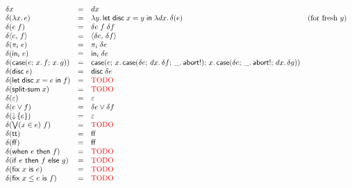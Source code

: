 \documentclass{article}
\begin{document}
\[
\begin{array}{lcll}
  \delta x &=& dx\\
  \delta(\fn\bind{x} e) &=& \fn\bind{y} \letdisc{x}{y} {\fn\bind{dx} \delta(e)}
  & \text{(for fresh $y$)}\\
  \delta(e\;f) &=& \delta e \; f \; \delta f\\
  \delta \pair{e}{f} &=& \pair{\delta{e}}{\delta{f}}\\
  \delta(\pi_i\; e) &=& \pi_i\; \delta{e}\\
  \delta(\inj{i}{e}) &=& \inj{i}{\delta{e}}\\
  \delta(\case{e}{x}{f}{x}{g})
  &=& \case{e}
        {x}{\case{\delta e}{dx}{\delta f}{\_}{\ms{abort!}}}
        {x}{\case{\delta e}{\_}{\ms{abort!}}{dx}{\delta g}}\\
  \delta(\disc e) &=& \disc{\delta e}\\
  \delta(\letdisc{x}{e}{f}) &=& \text{\TODO}\\
  \delta(\splitsum{x}) &=& \text{\TODO}\\
  \delta(\unit) &=& \unit\\
  \delta(e \vee f) &=& \delta e \vee \delta f\\
  \delta(\downintro{e}) &=& \unit\\
  \delta(\downelim{x}{e}{f}) &=& \text{\TODO}\\
  \delta(\ett) &=& \eff\\
  \delta(\eff) &=& \eff\\
  \delta(\when{e}{f}) &=& \text{\TODO}\\
  \delta(\ifthen{e}{f}{g}) &=& \text{\TODO}\\
  \delta(\fix{x}{e}) &=& \text{\TODO}\\
  \delta(\fixle{x}{e}{f}) &=& \text{\TODO}
\end{array}
\]
\end{document}
